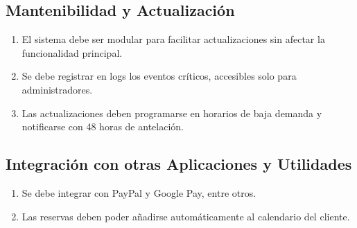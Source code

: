 \subsection*{Mantenibilidad y Actualización}
\begin{enumerate}[label=\textcolor{red}{RNF\arabic*}:]
    \item El sistema debe ser modular para facilitar actualizaciones sin afectar la funcionalidad principal.
    \item Se debe registrar en logs los eventos críticos, accesibles solo para administradores.
    \item Las actualizaciones deben programarse en horarios de baja demanda y notificarse con 48 horas de antelación.
\end{enumerate}

\subsection*{Integración con otras Aplicaciones y Utilidades}
\begin{enumerate}[label=\textcolor{red}{RNF\arabic*}:]
    \item Se debe integrar con PayPal y Google Pay, entre otros.
    \item Las reservas deben poder añadirse automáticamente al calendario del cliente.
\end{enumerate}






